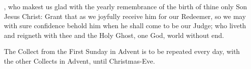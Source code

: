 , who makest us glad with the yearly remembrance of the birth of thine only Son Jesus Christ: Grant that as we joyfully receive him for our Redeemer, so we may with sure confidence behold him when he shall come to be our Judge; who liveth and reigneth with thee and the Holy Ghost, one God, world without end.
\begin{secrubric}
The Collect from the First Sunday in Advent is to be repeated every day, with the other Collects in Advent, until Christmas-Eve.
\end{secrubric}

